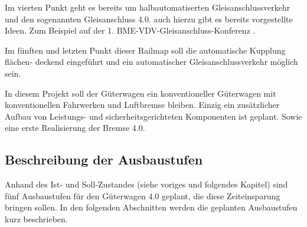 Im vierten Punkt geht es bereits um halbautomatiserten Gleisanschlussverkehr und den sogenannten Gleisanschluss 4.0. auch hierzu gibt es bereits vorgestellte Ideen. Zum Beispiel auf der 1. BME-VDV-Gleisanschluss-Konferenz \cite{GAK}. \par
Im fünften und letzten Punkt dieser Railmap soll die automatische Kupplung flächen- deckend eingeführt und ein automatischer Gleisanschlussverkehr möglich sein.\par
In diesem Projekt soll der Güterwagen ein konventioneller Güterwagen mit konventionellen Fahrwerken und Luftbremse bleiben. Einzig ein zusätzlicher Aufbau von Leistungs- und sicherheitsgerichteten Komponenten ist geplant. Sowie eine erste Realisierung der Bremse 4.0\cite{Stephenson, ETR_2}.\par

\subsection{Beschreibung der Ausbaustufen}\label{sec:Ausbaustufen}
Anhand des Ist- und Soll-Zustandes (siehe voriges und folgendes Kapitel) sind fünf Ausbaustufen für den Güterwagen 4.0 geplant, die diese Zeiteinsparung bringen sollen. In den folgenden Abschnitten werden die geplanten Ausbaustufen kurz beschrieben.\par

